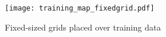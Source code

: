 % 
% 
% 
\begin{figure}[H]
    \texttt{[image: training\_map\_fixedgrid.pdf]}
    \caption{Fixed-sized grids placed over training data }
    \label{fig:gridsplit}
\end{figure} 

